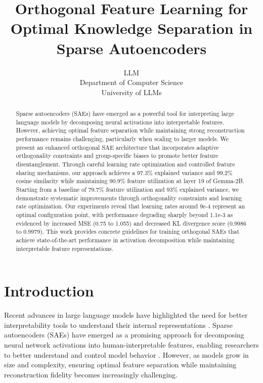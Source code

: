 \documentclass{article} %
\title{Orthogonal Feature Learning for Optimal Knowledge Separation in Sparse Autoencoders}
\author{LLM\\
Department of Computer Science\\
University of LLMs\\
}
\begin{document}
\maketitle

\begin{abstract}
Sparse autoencoders (SAEs) have emerged as a powerful tool for interpreting large language models by decomposing neural activations into interpretable features. However, achieving optimal feature separation while maintaining strong reconstruction performance remains challenging, particularly when scaling to larger models. We present an enhanced orthogonal SAE architecture that incorporates adaptive orthogonality constraints and group-specific biases to promote better feature disentanglement. Through careful learning rate optimization and controlled feature sharing mechanisms, our approach achieves a 97.3\% explained variance and 99.2\% cosine similarity while maintaining 90.9\% feature utilization at layer 19 of Gemma-2B. Starting from a baseline of 79.7\% feature utilization and 93\% explained variance, we demonstrate systematic improvements through orthogonality constraints and learning rate optimization. Our experiments reveal that learning rates around 9e-4 represent an optimal configuration point, with performance degrading sharply beyond 1.1e-3 as evidenced by increased MSE (0.75 to 1.055) and decreased KL divergence score (0.9986 to 0.9979). This work provides concrete guidelines for training orthogonal SAEs that achieve state-of-the-art performance in activation decomposition while maintaining interpretable feature representations.
\end{abstract}

\section{Introduction}
\label{sec:intro}

Recent advances in large language models have highlighted the need for better interpretability tools to understand their internal representations \cite{gaoScalingEvaluatingSparse}. Sparse autoencoders (SAEs) have emerged as a promising approach for decomposing neural network activations into human-interpretable features, enabling researchers to better understand and control model behavior \cite{pauloAutomaticallyInterpretingMillions2024}. However, as models grow in size and complexity, ensuring optimal feature separation while maintaining reconstruction fidelity becomes increasingly challenging.
\end{document}
